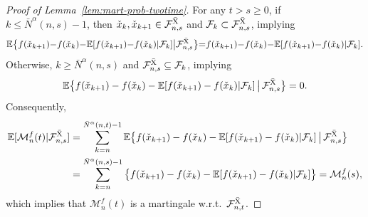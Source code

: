 \documentclass[11pt]{article}
\theoremstyle{plain}
\theoremstyle{definition}
\def\MM{{\mathcal M}}
\def\FM{{\mathcal F}}
\def\EB{{\mathbb E}}
\newcommand{\xcheck}{{\check{x}}}
\newcommand{\xbar}{{\bar{\textnormal{X}}}}
\newcommand{\ssum}[3]{\sum\limits_{{#1}={#2}}^{#3}}
\begin{document}
\begin{appendix}
\begin{proof}[Proof of Lemma~\ref{lem:mart-prob-twotime}]
    For any $t > s \ge 0$,
    if $k \le \bar{N}^\alpha(n,s)-1$, then $\xcheck_{k}, \xcheck_{k+1} \in \FM^\xbar_{n,s}$ and $\FM_k \subset \FM^\xbar_{n,s}$, implying
    \[ \EB \big\{ f(\xcheck_{k+1}) {-} f(\xcheck_{k}) {-} \EB[ f(\xcheck_{k+1}) {-} f(\xcheck_{k}) | \FM_{k} ] \big| \FM^\xbar_{n,s} \big\} {=} f(\xcheck_{k+1}) {-} f(\xcheck_{k}) {-} \EB[ f(\xcheck_{k+1}) {-} f(\xcheck_{k})  | \FM_{k} ].  \]
    Otherwise, $k \ge \bar{N}^\alpha(n,s) $ and  $\FM^\xbar_{n,s} \subseteq \FM_{k}$, implying
    \[
    \EB \big\{ f(\xcheck_{k+1}) - f(\xcheck_{k}) - \EB[ f(\xcheck_{k+1}) - f(\xcheck_{k}) | \FM_{k} ]\, \big|\, \FM^\xbar_{n,s} \big\} = 0.
    \]
    Consequently,
    \begin{align*}
        \EB [ \MM_{n}^f(t) | \FM^\xbar_{n,s} ]
        & = \ssum{k}{n}{\bar{N}^\alpha(n,t)-1} \EB \big\{ f(\xcheck_{k+1}) - f(\xcheck_{k}) - \EB[ f(\xcheck_{k+1}) - f(\xcheck_{k}) | \FM_{k} ]\, \big|\, \FM^\xbar_{n,s} \big\} \\
        & = \ssum{k}{n}{\bar{N}^\alpha(n,s)-1} \big\{ f(\xcheck_{k+1}) - f(\xcheck_{k}) - \EB[ f(\xcheck_{k+1}) - f(\xcheck_{k}) | \FM_{k} ] \big\} 
        = \MM_{n}^f(s),
    \end{align*}
    which implies that $\MM_{n}^f (t)$ is a martingale w.r.t.\ $\FM^\xbar_{n,t}$.
    

\end{proof}
\end{appendix}
\end{document}

